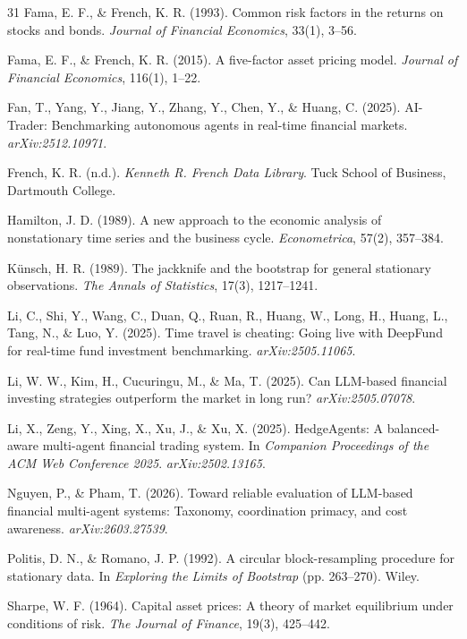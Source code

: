 \documentclass{article}
\begin{document}
\begin{thebibliography}{31}
Fama, E. F., \& French, K. R. (1993). Common risk factors in the returns on stocks and bonds. \textit{Journal of Financial Economics}, 33(1), 3--56.

Fama, E. F., \& French, K. R. (2015). A five-factor asset pricing model. \textit{Journal of Financial Economics}, 116(1), 1--22.

Fan, T., Yang, Y., Jiang, Y., Zhang, Y., Chen, Y., \& Huang, C. (2025). AI-Trader: Benchmarking autonomous agents in real-time financial markets. \textit{arXiv:2512.10971}.

French, K. R. (n.d.). \textit{Kenneth R. French Data Library}. Tuck School of Business, Dartmouth College.

Hamilton, J. D. (1989). A new approach to the economic analysis of nonstationary time series and the business cycle. \textit{Econometrica}, 57(2), 357--384.

K\"{u}nsch, H. R. (1989). The jackknife and the bootstrap for general stationary observations. \textit{The Annals of Statistics}, 17(3), 1217--1241.

Li, C., Shi, Y., Wang, C., Duan, Q., Ruan, R., Huang, W., Long, H., Huang, L., Tang, N., \& Luo, Y. (2025). Time travel is cheating: Going live with DeepFund for real-time fund investment benchmarking. \textit{arXiv:2505.11065}.

Li, W. W., Kim, H., Cucuringu, M., \& Ma, T. (2025). Can LLM-based financial investing strategies outperform the market in long run? \textit{arXiv:2505.07078}.

Li, X., Zeng, Y., Xing, X., Xu, J., \& Xu, X. (2025). HedgeAgents: A balanced-aware multi-agent financial trading system. In \textit{Companion Proceedings of the ACM Web Conference 2025}. \textit{arXiv:2502.13165}.

Nguyen, P., \& Pham, T. (2026). Toward reliable evaluation of LLM-based financial multi-agent systems: Taxonomy, coordination primacy, and cost awareness. \textit{arXiv:2603.27539}.

Politis, D. N., \& Romano, J. P. (1992). A circular block-resampling procedure for stationary data. In \textit{Exploring the Limits of Bootstrap} (pp. 263--270). Wiley.

Sharpe, W. F. (1964). Capital asset prices: A theory of market equilibrium under conditions of risk. \textit{The Journal of Finance}, 19(3), 425--442.


\end{thebibliography}
\end{document}
